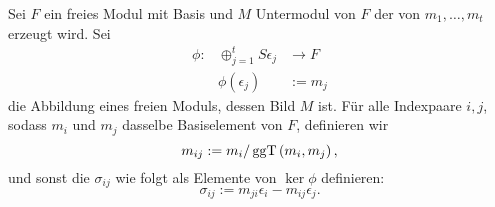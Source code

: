 \documentclass{article}
\begin{document}
	\begin{nota}
		Sei 
		\( F \) 
		ein freies Modul mit Basis 
		und
		\( M \)
		Untermodul von 
		\( F \)
		der von 
		\( m_{1} , \dots , m_{t} \)
		erzeugt wird.
		Sei
		\begin{align*}
			\phi:	& \oplus_{j=1}^{t} S\epsilon_{j} &\to   F \\
				& \phi\left( \epsilon_{j} \right) &:=  m_{j}
		\end{align*}
		die Abbildung eines freien Moduls, dessen Bild
		\( M \)
		ist.
		F\"ur alle Indexpaare 	
		\( i,j \),
		sodass 
		\( m_{i}\)
		und 
		\( m_{j}\)
		dasselbe Basiselement von 
		\( F \),
		definieren wir 
		\[
			m_{ij} := m_{i}/\operatorname{ggT}\left( m_{i},m_{j} \right) ,
		\]
		und sonst die 
		\( \sigma_{ij}\)
		wie folgt als Elemente von 
		\( \ker \phi \)
		definieren:
		\[
			\sigma_{ij} := m_{ji}\epsilon_{i}-m_{ij}\epsilon_{j} .
		\]

	\end{nota}
\end{document}
